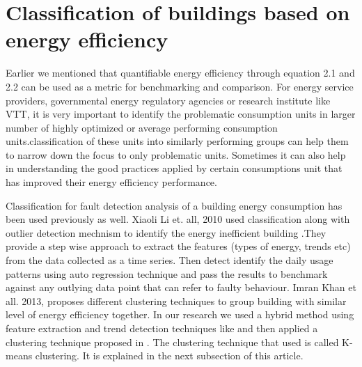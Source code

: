 \section{Classification of buildings based on energy efficiency}

Earlier we mentioned that quantifiable energy efficiency through equation 2.1 and 2.2 can be used as a metric for benchmarking and comparison. For energy service providers, governmental energy regulatory agencies or research institute like VTT, it is very important to identify the problematic consumption units in larger number of highly optimized or average performing consumption units.classification of these units into similarly performing groups can help them to narrow down the focus to only problematic units. Sometimes it can also help in understanding the good practices applied by certain consumptions unit that has improved their energy efficiency performance.
  
Classification for fault detection analysis of a building energy consumption has been used previously as well. Xiaoli Li et. all, 2010 used classification along with outlier detection mechnism to identify the energy inefficient building \cite{li2010classification}.They provide a step wise approach to extract the features (types of energy, trends etc) from the data collected as a time series. Then detect identify the daily usage patterns using auto regression technique and pass the results to benchmark against any outlying data point that can refer to faulty behaviour. Imran Khan et all. 2013, proposes different clustering techniques to group building with similar level of energy efficiency together\cite{khan2013fault}. In our research we used a hybrid method using feature extraction and trend detection techniques like \cite{li2010classification} and then applied a clustering technique proposed in \cite{khan2013fault}. The clustering technique that used is called K-means clustering. It is explained in the next subsection of this article. 

